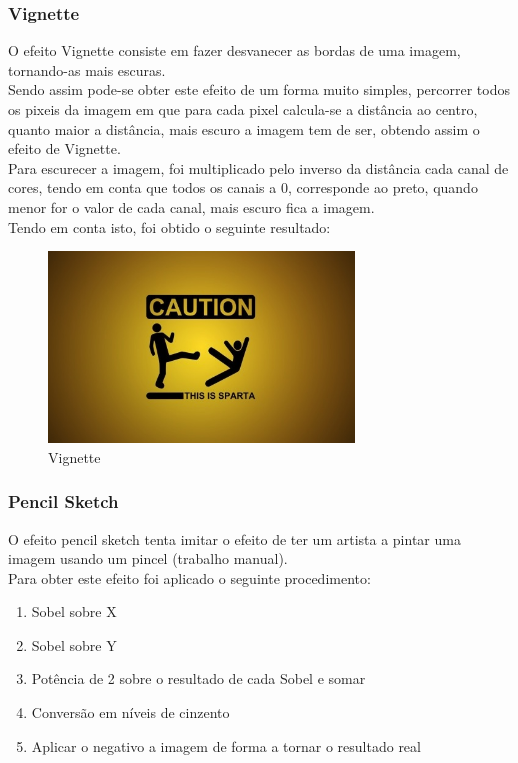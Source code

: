 \documentclass[portugues,final]{revdetua}
\begin{document}
\subsubsection{Vignette}

O efeito Vignette consiste em fazer desvanecer as bordas de uma imagem, tornando-as mais escuras.\\

Sendo assim pode-se obter este efeito de um forma muito simples, percorrer todos os pixeis da imagem em que para cada pixel calcula-se a distância ao centro, quanto maior a distância, mais escuro a imagem tem de ser, obtendo assim o efeito de Vignette.\\

Para escurecer a imagem, foi multiplicado pelo inverso da distância cada canal de cores, tendo em conta que todos os canais a 0, corresponde ao preto, quando menor for o valor de cada canal, mais escuro fica a imagem.\\

Tendo em conta isto, foi obtido o seguinte resultado:

\begin{figure}[H]
\centerline{\includegraphics[width=230pt]{images/vignette.jpeg}}
\caption{Vignette}
\label{img:complete}
\end{figure}

\subsubsection{Pencil Sketch}

O efeito pencil sketch tenta imitar o efeito de ter um artista a pintar uma imagem usando um pincel (trabalho manual).\\

Para obter este efeito foi aplicado o seguinte procedimento:
\begin{enumerate}
\item Sobel sobre X
\item Sobel sobre Y
\item Potência de 2 sobre o resultado de cada Sobel e somar
\item Conversão em níveis de cinzento
\item Aplicar o negativo a imagem de forma a tornar o resultado real
\end{enumerate} 
\end{document}
